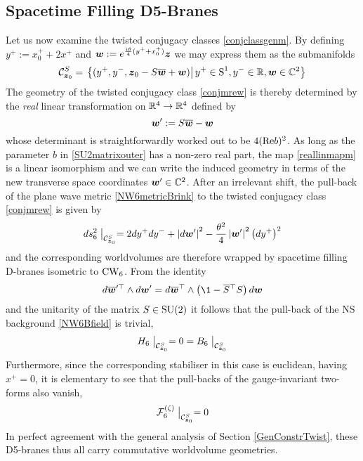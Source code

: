 \subsection{Spacetime Filling D5-Branes}
\label{LorD5}
Let us now examine the twisted conjugacy classes \eqref{conjclassgenm}. By
defining $y^+:=x_0^++2x^+$ and ${{\boldsymbol {w} }}:= e^{\frac{ i\theta}4 (y^++x_0^+)} {{\boldsymbol {z} }}$ we may
express them as the submanifolds
\begin{equation}
  \label{conjmrew}
  \mathcal{C}_{{{\boldsymbol {z} }}_0}^S=\left.\left\{(y^+,y^-,{{\boldsymbol {z} }}_0-S \overline{{{\boldsymbol {w} }}}+{{\boldsymbol {w} }}) 
    \right| y^+\in\operatorname{S}^1 , y^-\in{\mathbb R} , {{\boldsymbol {w} }}\in{\mathbb C}^2\right\}
\end{equation}
The geometry of the twisted conjugacy class \eqref{conjmrew} is
thereby determined by the {\it real} linear transformation on
${\mathbb R}^4\to{\mathbb R}^4$ defined by
\begin{equation}
  \label{reallinmapm}
  {{\boldsymbol {w} }}':=S \overline{{{\boldsymbol {w} }}}-{{\boldsymbol {w} }}
\end{equation}
whose determinant is straightforwardly worked out to be $4({\rm Re} b)^2$. As
long as the parameter $b$ in \eqref{SU2matrixouter} has a non-zero real part,
the map \eqref{reallinmapm} is a linear isomorphism and we can write the induced
geometry in terms of the new transverse space coordinates ${{\boldsymbol {w} }}'\in{\mathbb C}^2$.
After an irrelevant shift, the pull-back of the plane wave metric
\eqref{NW6metricBrink} to the twisted conjugacy class \eqref{conjmrew} is given
by
\begin{equation}
  \label{D5metricpull}
  d s_6^2\bigm|_{\mathcal{C}_{{{\boldsymbol {z} }}_0}^S}=2  d y^+  d y^-+\left| d
    {{\boldsymbol {w} }}' \right|^2-\frac{\theta^2}4 \left|{{\boldsymbol {w} }}' 
  \right|^2 \left( d y^+\right)^2
\end{equation}
and the corresponding worldvolumes are therefore wrapped by spacetime
filling D-branes isometric to $\operatorname{CW}_6$. From the identity
\begin{equation}
  \label{dwidentity}
  d\overline{\mw}{}^{ \prime \top}\wedge d\mw'= d\overline{\mw}{}^{ \top}
  \wedge\left(\1-\overline{S}{}^{ \top} S\right)  d\mw
\end{equation}
and the unitarity of the matrix $S\in{\rm SU}(2)$ it follows that the pull-back
of the NS background \eqref{NW6Bfield} is trivial,
\begin{equation}
  \label{D5Bpull}
  H_6\bigm|_{\mathcal{C}_{{{\boldsymbol {z} }}_0}^S} = 0 = 
  B_6\bigm|_{\mathcal{C}_{{{\boldsymbol {z} }}_0}^S}
\end{equation}
Furthermore, since the corresponding stabiliser in this case is euclidean,
having $x^+=0$, it is elementary to see that the pull-backs of the
gauge-invariant two-forms also vanish,
\begin{equation}
  \label{D5F6pull}
  \mathcal{F}^{(\zeta)}_6\bigm|_{\mathcal{C}_{{{\boldsymbol {z} }}_0}^S} = 0
\end{equation}
In perfect agreement with the general analysis of Section \ref{GenConstrTwist},
these D5-branes thus all carry commutative worldvolume geometries.


